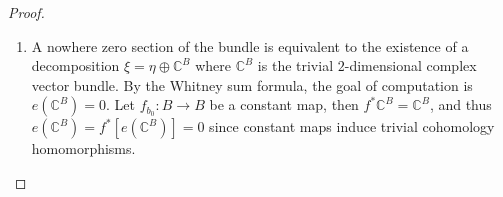 \documentclass[10pt]{article}
\begin{document}
\begin{proof}{}
\begin{enumerate}
\item
A nowhere zero section of the bundle is equivalent to the existence of a decomposition $\xi=\eta\oplus\mathbb{C}^B$ where $\mathbb{C}^B$ is the trivial $2$-dimensional complex vector bundle. By the Whitney sum formula, the goal of computation is $e(\mathbb{C}^B)=0$. Let $f_{b_0}:B\to B$ be a constant map, then $f^*\mathbb{C}^B=\mathbb{C}^B$, and thus $e(\mathbb{C}^B)=f^*[e(\mathbb{C}^B)]=0$ since constant maps induce trivial cohomology homomorphisms.
\end{enumerate}
\end{proof}
\end{document}
